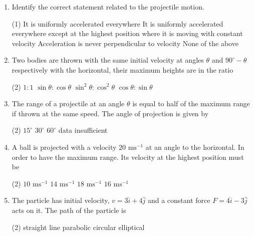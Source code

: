 \documentclass{article}
\begin{document}
\begin{enumerate}
    \item Identify the correct statement related to the projectile motion.
    \begin{tasks}(1)
        \task It is uniformly accelerated everywhere
        \task It is uniformly accelerated everywhere except at the highest position where it is moving with constant velocity
        \task Acceleration is never perpendicular to velocity
        \task None of the above
    \end{tasks}

    \item Two bodies are thrown with the same initial velocity at angles \(\theta\) and \(90^{\circ}-\theta\) respectively with the horizontal, their maximum heights are in the ratio
    \begin{tasks}(2)
        \task \(1 : 1\)
        \task \(\sin{\theta} : \cos{\theta}\)
        \task \(\sin^{2}{\theta} : \cos^{2}{\theta}\)
        \task \(\cos{\theta} : \sin{\theta}\)
    \end{tasks}

    \item The range of a projectile at an angle \(\theta\) is equal to half of the maximum range if thrown at the same speed. The angle of projection is given by
    \begin{tasks}(2)
        \task \(15^{\circ}\)
        \task \(30^{\circ}\)
        \task \(60^{\circ}\)
        \task data insufficient
    \end{tasks}

    \item A ball is projected with a velocity \(20 \text{ ms}^{-1}\) at an angle to the horizontal. In order to have the maximum range. Its velocity at the highest position must be
    \begin{tasks}(2)
        \task \(10 \text{ ms}^{-1}\)
        \task \(14 \text{ ms}^{-1}\)
        \task \(18 \text{ ms}^{-1}\)
        \task \(16 \text{ ms}^{-1}\)
    \end{tasks}

    \item The particle has initial velocity, \(v = 3\hat{i} + 4\hat{j}\) and a constant force \(F = 4\hat{i} - 3\hat{j}\) acts on it. The path of the particle is
    \begin{tasks}(2)
        \task straight line
        \task parabolic
        \task circular
        \task elliptical
    \end{tasks}


\end{enumerate}
\end{document}

